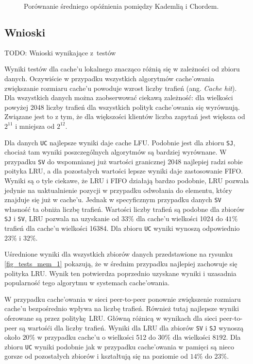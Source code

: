 \documentclass[a4paper,11pt]{scrartcl}
\newcommand{\f}{\texttt}
\newcommand{\s}{ }
\newcommand{\kesz}{cache}
\newcommand{\keszu}{cache'u}
\newcommand{\keszowania}{cache'owania}
\begin{document}
\begin{figure}[h!]

\caption{Porównanie średniego opóźnienia pomiędzy Kademlią i Chordem.}
\label{fig_latency}
\end{figure}

\subsection{Wnioski}
TODO: Wnioski wynikające z~testów

Wyniki testów dla \keszu\s lokalnego znacząco różnią się w zależności od zbioru danych. Oczywiście w przypadku wszystkich algorytmów \keszowania\s zwiększanie rozmiaru \keszu\s powoduje wzrost liczby trafień (ang. \textit{Cache hit}). Dla wszystkich danych można zaobserwować ciekawą zależność: dla wielkości powyżej 2048 liczby trafień dla wszystkich polityk \keszowania\s się wyrównują. Związane jest to z tym, że dla większości klientów liczba zapytań jest większa od $2^{11}$ i mniejsza od $2^{12}$.

Dla danych \f{UC} najlepsze wyniki daje \kesz\s LFU. Podobnie jest dla zbioru \f{SJ}, chociaż tam wyniki poszczególnych algorytmów są bardziej wyrównane. W przypadku \f{SV} do wspomnianej już wartości granicznej 2048 najlepiej radzi sobie poityka LRU, a dla pozostałych wartości lepsze wyniki daje zastosowanie FIFO. Wyniki są o tyle ciekawe, że LRU i FIFO działają bardzo podobnie, LRU pozwala jedynie na uaktualnienie pozycji w przypadku odwołania do elementu, który znajduje się już w \keszu. Jednak w specyficznym przypadku danych \f{SV} własność ta obniża liczbę trafień.
Wartości liczby trafień są podobne dla zbiorów \f{SJ} i \f{SV}, LRU pozwala na uzyskanie od $33\%$ dla \keszu\s wielkości 1024 do $41\%$ trafień dla \keszu\s wielkości 16384. Dla zbioru \f{UC} wyniki wynoszą odpowiednio $23\%$ i $32\%$.

Uśrednione wyniki dla wszystkich zbiorów danych przedstawione na rysunku \ref{fig_tests_mem_1} pokazują, że w średnim przypadku najlepiej zachowuje się polityka LRU. Wynik ten potwierdza poprzednio uzyskane wyniki \cite{breslau1999web} i uzasadnia popularność tego algorytmu w systemach \keszowania. 

W przypadku \keszowania\s w sieci peer-to-peer ponownie zwiększenie rozmiaru \keszu\s bezpośrednio wpływa na liczbę trafień. Również tutaj najlepsze wyniki oferowane są przez politykę LRU. Główną różnicą w wynikach dla sieci peer-to-peer są wartośći dla liczby trafień. Wyniki dla LRU dla zbiorów \f{SV} i \f{SJ} wynoszą około $20\%$ w przypadku \keszu\s o wielkości 512 do $30\%$ dla wielkości $8192$. Dla zbioru \f{UC} wyniki podobnie jak w przypadku \keszowania\s w pamięci są nieco gorsze od pozostałych zbiorów i kształtują się na poziomie od $14\%$ do $23\%$.
\end{document}
